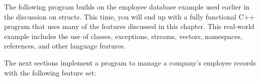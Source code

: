 
The following program builds on the employee database example used earlier in the discussion on structs. This time, you will end up with a fully functional C++ program that uses many of the features discussed in this chapter. This real-world example includes the use of classes, exceptions, streams, vectors, namespaces, references, and other language features.


The next sections implement a program to manage a company’s employee records with the following feature set:















